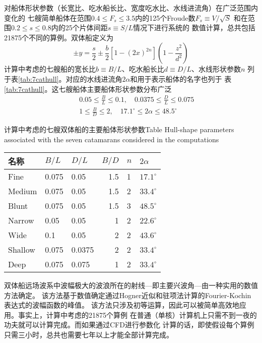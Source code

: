 对船体形状参数（长宽比、吃水船长比、宽度吃水比、水线进流角）在广泛范围内变化的
七艘简单船体在范围$0.4\le F_s\le 3.5$内的125个Froude数$F_s\equiv V/\sqrt{S}$
和在范围$0.2\le s \le 0.8$内的25个片体间距$s\equiv S/L$情况下进行系统的
数值计算，总共包括21875个不同的算例。双体船定义为
\begin{equation}
  \pm y=\frac{s}{2}\pm\frac{b}{2}[1-(2x)^{2n}]\left(1-\frac{z^2}{d^2}\right)
  \label{eq:cathull}
\end{equation}
计算中考虑的七艘船的宽长比$b\equiv B/L$、吃水船长比$d\equiv D/L$、水线形状参数$n$
列于表\ref{tab:7cathull}。对应的水线进流角$2\alpha$和用于表示船体的名字也列于
表\ref{tab:7cathull}。这七艘船体主要船体形状参数分布广泛
\begin{eqnarray*}
  &&0.05\le \frac{B}{L}\le0.1,\quad 0.0375\le\frac{D}{L}\le0.075\\
  &&1\le\frac{B}{D}\le 2,\quad 17.1^\circ\le 2\alpha\le48.5^\circ
\end{eqnarray*}
%
\begin{table}
  \centering
  \begin{minipage}[b]{0.6\textwidth}
    \captionstyle{\centering}
    {计算中考虑的七艘双体船的主要船体形状参数}{Table}
    {Hull-shape parameters associated with the seven catamarans 
      considered in the computations}
    \end{minipage}
    \begin{tabular*}{0.8\textwidth}{@{\extracolsep{\fill}}lllrll@{}}\toprule
      名称 & $B/L$ & $D/L$ & $B/D$ & $n$ & $2\alpha$ \\ \midrule
      Fine & 0.075 & 0.05 & 1.5 & 1 & $17.1^\circ$\\
      Medium & 0.075 & 0.05 & 1.5 & 2 & $33.4^\circ$\\
      Blunt & 0.075 & 0.05 & 1.5 & 3 & $48.5^\circ$\\
      Narrow & 0.05 & 0.05 & 1 & 2 & $22.6^\circ$\\
      Wide & 0.1 & 0.05 & 2 & 2 & $43.6^\circ$\\
      Shallow & 0.075 & 0.0375 & 2 & 2 & $33.4^\circ$\\
      Deep & 0.075 & 0.075 & 1 & 2 & $33.4^\circ$\\ \bottomrule
  \end{tabular*}
\end{table}

双体船远场波系中波幅极大的波浪所在的射线---即主要兴波角---由一种实用的数值方法确定。
该方法基于数值确定通过Hogner近似和驻项法计算的Fourier-Kochin表达式的波幅函数的峰值。
该方法只涉及初等运算，因此可以被简单高效地应用。事实上，计算中考虑的21875个算例
在普通（单核）计算机上只需不到一夜的功夫就可以计算完成。而如果通过CFD进行参数化
计算的话，即使假设每个算例只需三小时，总共也需要七年以上才能全部计算完成。

